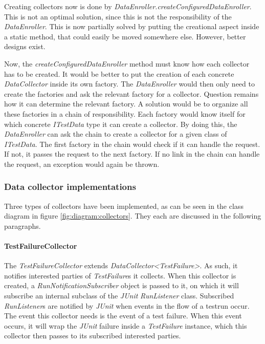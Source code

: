 \documentclass[i2]{oss}
\newcommand{\class}[1]{\emph{#1}}
\newcommand{\method}[1]{\emph{#1}}
\newcommand{\junit}{\emph{JUnit }}
\begin{document}
Creating collectors now is done by \class{DataEnroller.createConfiguredDataEnroller}.
This is not an optimal solution, since this is not the responsibility of the \class{DataEnroller}.
This is now partially solved by putting the creational aspect inside a static method, that could easily be moved somewhere else.
However, better designs exist.

Now, the \method{createConfiguredDataEnroller} method must know how each collector has to be created.
It would be better to put the creation of each concrete \class{DataCollector} inside its own factory.
The \class{DataEnroller} would then only need to create the factories and ask the relevant factory for a collector.
Question remains how it can determine the relevant factory.
A solution would be to organize all these factories in a chain of responsibility.
Each factory would know itself for which concrete \class{ITestData} type it can create a collector.
By doing this, the \class{DataEnroller} can ask the chain to create a collector for a given class of \class{ITestData}.
The first factory in the chain would check if it can handle the request.
If not, it passes the request to the next factory.
If no link in the chain can handle the request, an exception would again be thrown.

\subsubsection{Data collector implementations}

Three types of collectors have been implemented, as can be seen in the class diagram in figure \ref{fig:diagram:collectors}.
They each are discussed in the following paragraphs.

\paragraph{TestFailureCollector}

The \class{TestFailureCollector} extends \class{DataCollector<TestFailure>}.
As such, it notifies interested parties of \class{TestFailure}s it collects.
When this collector is created, a \class{RunNotificationSubscriber} object is passed to it, on which it will subscribe an internal subclass of the \junit \class{RunListener} class.
Subscribed \class{RunListener}s are notified by \junit when events in the flow of a testrun occur.
The event this collector needs is the event of a test failure.
When this event occurs, it will wrap the \junit failure inside a \class{TestFailure} instance, which this collector then passes to its subscribed interested parties.
\end{document}

